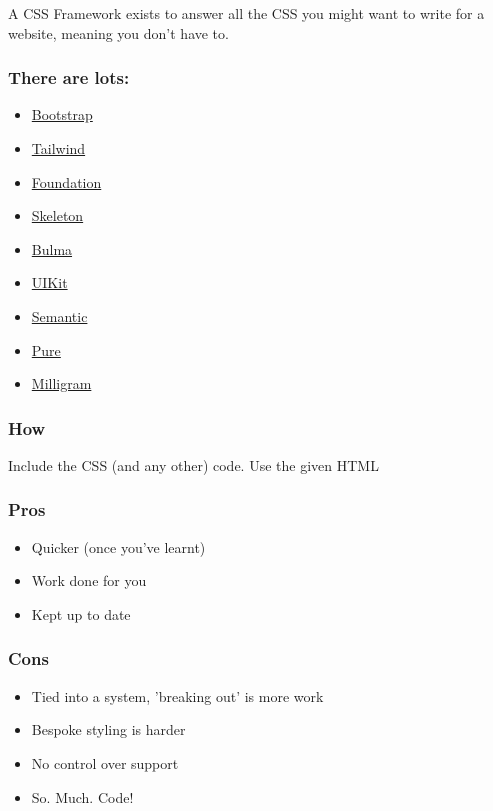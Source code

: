 A CSS Framework exists to answer all the CSS you might want to write for a website, meaning you don't have to.

\subsubsection{There are lots:}

\begin{itemize}
    \item \href{https://getbootstrap.com/}{Bootstrap}
    \item \href{https://tailwindcss.com/}{Tailwind}
    \item \href{https://get.foundation/}{Foundation}
    \item \href{http://getskeleton.com/}{Skeleton}
    \item \href{https://bulma.io/}{Bulma}
    \item \href{https://getuikit.com/}{UIKit}
    \item \href{https://semantic-ui.com/}{Semantic}
    \item \href{https://purecss.io/}{Pure}
    \item \href{https://milligram.io/}{Milligram}
\end{itemize}

\subsubsection{How}

Include the CSS (and any other) code. Use the given HTML

\subsubsection{Pros}

\begin{itemize}
    \item Quicker (once you've learnt)
    \item Work done for you
    \item Kept up to date
\end{itemize}


\subsubsection{Cons}

\begin{itemize}
    \item Tied into a system, 'breaking out' is more work
    \item Bespoke styling is harder
    \item No control over support
    \item So. Much. Code!
\end{itemize}

